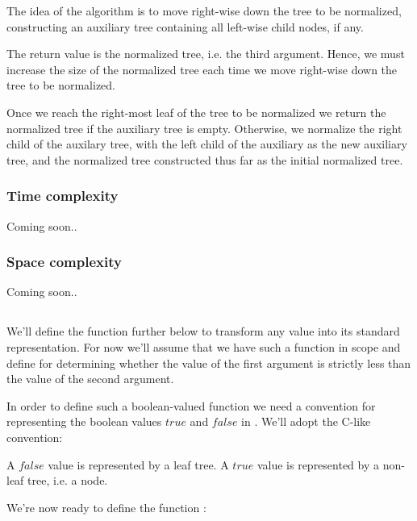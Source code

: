 The idea of the algorithm is to move right-wise down the tree to be normalized,
constructing an auxiliary tree containing all left-wise child nodes, if any.

The return value is the normalized tree, i.e. the third argument. Hence, we
must increase the size of the normalized tree each time we move right-wise down
the tree to be normalized.

Once we reach the right-most leaf of the tree to be normalized we return the
normalized tree if the auxiliary tree is empty. Otherwise, we normalize the
right child of the auxilary tree, with the left child of the auxiliary as the
new auxiliary tree, and the normalized tree constructed thus far as the initial
normalized tree.

\subsubsection{Time complexity}

Coming soon..

\subsubsection{Space complexity}

Coming soon..

\subsection{}\label{section:d-size-less}

We'll define the function  further below to transform any
\D{} value into its standard representation. For now we'll assume that we have
such a function in scope and define  for determining whether the
value of the first argument is strictly less than the value of the second
argument.

In order to define such a boolean-valued function we need a convention for
representing the boolean values $true$ and $false$ in \D{}. We'll adopt the
C-like convention:

\begin{definition}

A $false$ value is represented by a leaf tree. A $true$ value is represented by
a non-leaf tree, i.e. a node.

\end{definition}

We're now ready to define the function :

